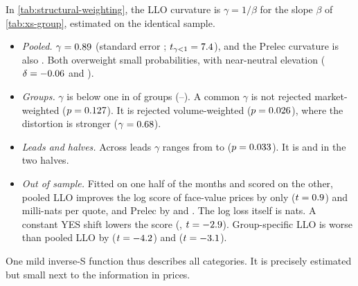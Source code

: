 In \cref{tab:structural-weighting}, the LLO curvature is $\gamma=1/\beta$ for the slope $\beta$ of
\cref{tab:xs-group}, estimated on the identical sample.
\begin{itemize}
  \item \emph{Pooled.} $\gamma=0.89$ (standard error \sdAllGammaSe; $t_{\gamma<1}=7.4$), and the
  Prelec curvature is also \sdAllPrGamma. Both overweight small probabilities, with near-neutral elevation
  ($\delta=-0.06$ and \sdAllPrDelta).
  \item \emph{Groups.} $\gamma$ is below one in \sdGammaBelowOne{} of \sdNGroups{} groups (\sdGammaMin--\sdGammaMax).
  A common $\gamma$ is not rejected market-weighted ($p=0.127$). It is rejected volume-weighted
  ($p=0.026$), where the distortion is stronger ($\gamma=0.68$).
  \item \emph{Leads and halves.} Across leads $\gamma$ ranges from \sdLeadGammaMin{} to \sdLeadGammaMax{}
  ($p=0.033$). It is \sdHalfFirstGamma{} and \sdHalfSecondGamma{} in the two halves.
  \item \emph{Out of sample.} Fitted on one half of the months and scored on the other, pooled LLO improves the log
  score of face-value prices by only \sdOosFsLlo{} ($t=0.9$) and \sdOosSfLlo{} milli-nats per quote, and
  Prelec by \sdOosFsPrelec{} and \sdOosSfPrelec. The log loss itself is \sdOosFsCalLs{} nats. A constant YES shift
  lowers the score (\sdOosFsShift, $t=-2.9$). Group-specific LLO is worse than pooled LLO by
  \sdOosFsGroupVsPooled{} ($t=-4.2$) and \sdOosSfGroupVsPooled{} ($t=-3.1$).
\end{itemize}
One mild inverse-S function thus describes all categories. It is precisely estimated but small next to the
information in prices.

